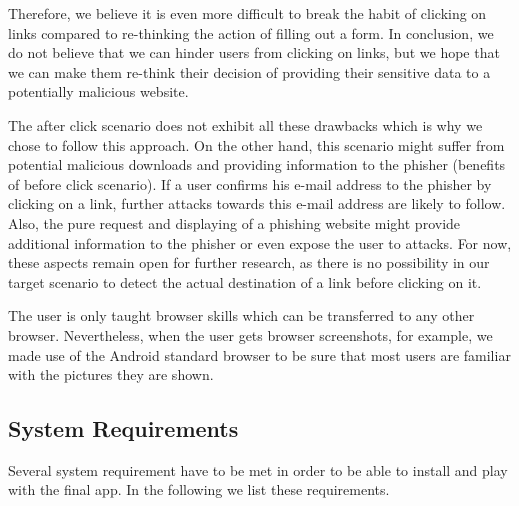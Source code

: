 \begin{description}[leftmargin=0cm]
\begin{enumerate}
Therefore, we believe it is even more difficult to break the habit of clicking on links compared to re-thinking the action of filling out a form.
In conclusion, we do not believe that we can hinder users from clicking on links, but we hope that we can make them re-think their decision of providing their sensitive data to a potentially malicious website.
\end{enumerate}
The after click scenario does not exhibit all these drawbacks which is why we chose to follow this approach.
On the other hand, this scenario might suffer from potential malicious downloads and providing information to the phisher (benefits of before click scenario).
If a user confirms his e-mail address to the phisher by clicking on a link, further attacks towards this e-mail address are likely to follow.
Also, the pure request and displaying of a phishing website might provide additional information to the phisher or even expose the user to attacks.
For now, these aspects remain open for further research, as there is no possibility in our target scenario to detect the actual destination of a link before clicking on it.

	\item[Considered Browser:] The user is only taught browser skills which can be transferred to any other browser.
Nevertheless, when the user gets browser screenshots, for example, we made use of the Android standard browser to be sure that most users are familiar with the pictures they are shown.
\end{description}	

\subsection{System Requirements}
\label{s:sys_requirements}
Several system requirement have to be met in order to be able to install and play with the final app.
In the following we list these requirements.


